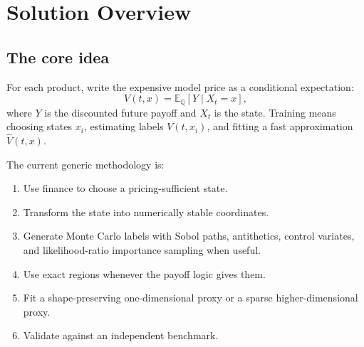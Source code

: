 \documentclass[11pt,oneside]{book}
\theoremstyle{definition}
\newcommand{\E}{\mathbb{E}}
\newcommand{\Q}{\mathbb{Q}}
\begin{document}
\chapter{Solution Overview}

\section{The core idea}
For each product, write the expensive model price as a conditional expectation:
\[
  V(t,x)=\E_\Q[Y\mid X_t=x],
\]
where \(Y\) is the discounted future payoff and \(X_t\) is the state. Training means choosing states \(x_i\), estimating labels \(V(t,x_i)\), and fitting a fast approximation \(\widehat V(t,x)\).

The current generic methodology is:
\begin{enumerate}
  \item Use finance to choose a pricing-sufficient state.
  \item Transform the state into numerically stable coordinates.
  \item Generate Monte Carlo labels with Sobol paths, antithetics, control variates, and likelihood-ratio importance sampling when useful.
  \item Use exact regions whenever the payoff logic gives them.
  \item Fit a shape-preserving one-dimensional proxy or a sparse higher-dimensional proxy.
  \item Validate against an independent benchmark.
\end{enumerate}
\end{document}
